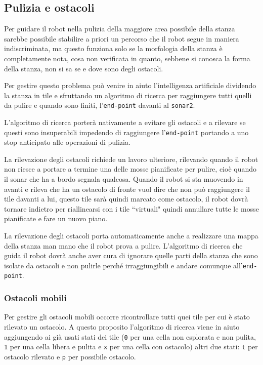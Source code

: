 \subsection{Pulizia e ostacoli}
Per guidare il robot nella pulizia della maggiore area possibile della stanza sarebbe possibile stabilire a priori un percorso che il robot segue in maniera indiscriminata, ma questo funziona solo se la morfologia della stanza è completamente nota, cosa non verificata in quanto, sebbene si conosca la forma della stanza, non si sa se e dove sono degli ostacoli.

Per gestire questo problema può venire in aiuto l'intelligenza artificiale dividendo la stanza in tile e sfruttando un algoritmo di ricerca per raggiungere tutti quelli da pulire e quando sono finiti, l'\texttt{end-point} davanti al \texttt{sonar2}.

L'algoritmo di ricerca porterà nativamente a evitare gli ostacoli e a rilevare se questi sono insuperabili impedendo di raggiungere l'\texttt{end-point} portando a uno stop anticipato alle operazioni di pulizia.

La rilevazione degli ostacoli richiede un lavoro ulteriore, rilevando quando il robot non riesce a portare a termine una delle mosse pianificate per pulire, cioè quando il sonar che ha a bordo segnala qualcosa. Quando il robot si sta muovendo in avanti e rileva che ha un ostacolo di fronte vuol dire che non può raggiungere il tile davanti a lui, questo tile sarà quindi marcato come ostacolo, il robot dovrà tornare indietro per riallinearsi con i tile ``virtuali" quindi annullare tutte le mosse pianificate e fare un nuovo piano. 

La rilevazione degli ostacoli porta automaticamente anche a realizzare una mappa della stanza man mano che il robot prova a pulire. L'algoritmo di ricerca che guida il robot dovrà anche aver cura di ignorare quelle parti della stanza che sono isolate da ostacoli e non pulirle perché irraggiungibili e andare comunque all'\texttt{end-point}.

\subsubsection{Ostacoli mobili}
Per gestire gli ostacoli mobili occorre ricontrollare tutti quei tile per cui è stato rilevato un ostacolo. A questo proposito l'algoritmo di ricerca viene in aiuto aggiungendo ai già usati stati dei tile (\texttt{0} per una cella non esplorata e non pulita, \texttt{1} per una cella libera e pulita e \texttt{x} per una cella con ostacolo) altri due stati: \texttt{t} per ostacolo rilevato e \texttt{p} per possibile ostacolo.

